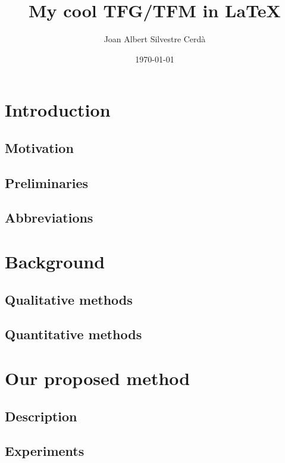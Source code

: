 \documentclass[12pt]{book}
\title{\textbf{My cool TFG/TFM in \LaTeX}}
\author{Joan Albert Silvestre Cerdà}
\date{\today}
\begin{document}
\maketitle            

\tableofcontents      


\chapter{Introduction}  
 
\section{Motivation}

\section{Preliminaries}

\section{Abbreviations}


\chapter{Background}

\section{Qualitative methods}

\section{Quantitative methods}


\chapter{Our proposed method}

\section{Description}

\section{Experiments}
\end{document}
